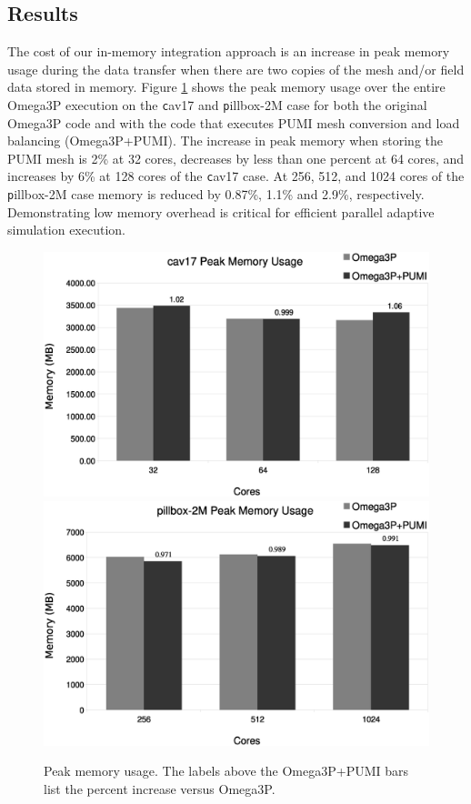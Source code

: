 \documentclass[review,12pt]{elsarticle_summary_report}
\begin{document}
\subsection{\label{in_memory_results} Results}
The cost of our in-memory integration approach is an increase in peak memory
usage during the data transfer when there are two copies of the mesh and/or
field data stored in memory.
Figure \ref{fig:memusage} shows the peak memory usage over the entire Omega3P
execution on the {\texttt cav17} and {\texttt pillbox-2M} case for both the
original Omega3P code and with the code that executes PUMI mesh conversion and
load balancing (Omega3P+PUMI).
The increase in peak memory when storing the PUMI mesh is 2\% at 32 cores,
decreases by less than one percent at 64 cores, and increases by 6\% at 128
cores of the {\texttt cav17} case.
At 256, 512, and 1024 cores of the {\texttt pillbox-2M} case memory is reduced by
0.87\%, 1.1\% and 2.9\%, respectively.
Demonstrating low memory overhead is critical for efficient parallel adaptive
simulation execution.

\begin{figure}[!ph]
\centering
  \includegraphics[width=.9\textwidth]{cav17-peak-mem.eps}
  \includegraphics[width=.9\textwidth]{pillbox2M-peak-mem.eps}
  \caption{\label{fig:memusage} Peak memory usage. The labels above the Omega3P+PUMI bars
  list the percent increase versus Omega3P.}
\end{figure}
\end{document}
